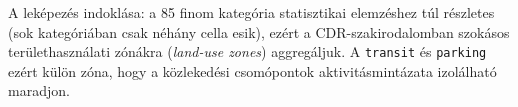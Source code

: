 A leképezés indoklása: a 85 finom kategória statisztikai elemzéshez túl részletes (sok kategóriában csak néhány cella esik), ezért a CDR-szakirodalomban szokásos területhasználati zónákra (\textit{land-use zones}) aggregáljuk. A \texttt{transit} és \texttt{parking} ezért külön zóna, hogy a közlekedési csomópontok aktivitásmintázata izolálható maradjon.
